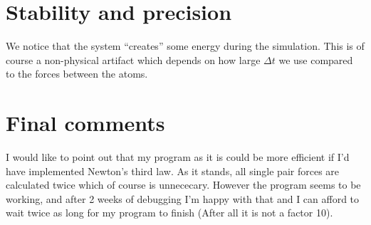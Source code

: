 \documentclass[a4paper,english, 10pt, twoside]{article}
\begin{document}
\section{Stability and precision}
We notice that the system ``creates'' some energy during the simulation. This is of course 
a non-physical artifact which depends on how large $\Delta t$ we use compared to the forces 
between the atoms.
\section{Final comments}
I would like to point out that my program as it is could be more efficient if I'd have 
implemented Newton's third law. As it stands, all single pair forces are calculated twice which 
of course is unnececary. However the program seems to be working, and after 2 weeks of 
debugging I'm happy with that and I can afford to wait twice as long for my program to finish 
(After all it is not a factor 10). 
% 
% 
% 
\end{document}
